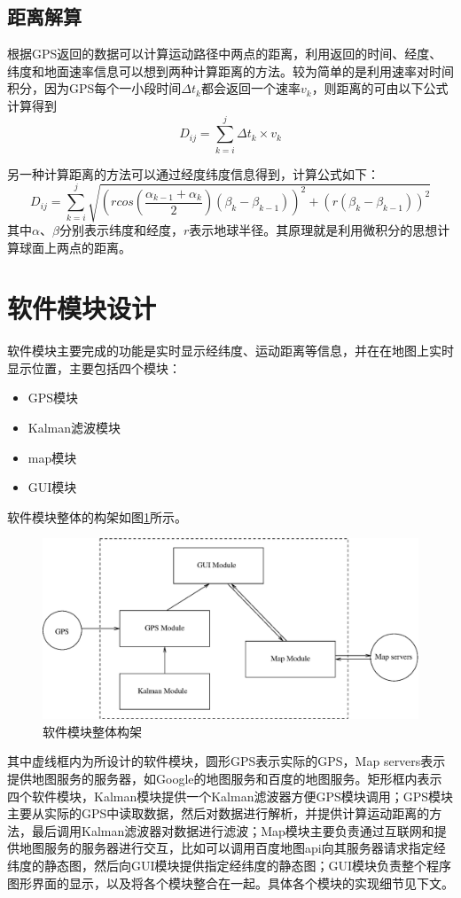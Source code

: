 \documentclass[a4paper, 12pt]{article}
\begin{document}
\subsection{距离解算}
根据GPS返回的数据可以计算运动路径中两点的距离，利用返回的时间、经度、纬度和地面速率信息可以想到两种计算距离的方法。较为简单的是利用速率对时间积分，因为GPS每个一小段时间$\Delta t_k$都会返回一个速率$v_k$，则距离的可由以下公式计算得到
\begin{equation}
  \label{eq:5}
  D_{ij} = \sum_{k=i}^j{\Delta t_k \times v_k}
\end{equation}

另一种计算距离的方法可以通过经度纬度信息得到，计算公式如下：
\begin{equation}
  \label{eq:6}
  D_{ij} = \sum_{k=i}^j{\sqrt{(rcos(\frac{\alpha_{k-1}+\alpha_k}{2})(\beta_k-\beta_{k-1}))^2+(r(\beta_k-\beta_{k-1}))^2}}
\end{equation}
其中$\alpha$、$\beta$分别表示纬度和经度，$r$表示地球半径。其原理就是利用微积分的思想计算球面上两点的距离。

\section{软件模块设计}
软件模块主要完成的功能是实时显示经纬度、运动距离等信息，并在在地图上实时显示位置，主要包括四个模块：
\begin{itemize}
\item GPS模块
\item Kalman滤波模块
\item map模块
\item GUI模块
\end{itemize}
软件模块整体的构架如图\ref{fig:2}所示。
\begin{figure}[ht]
  \centering
  \includegraphics[width=15cm]{f2.eps}
  \caption{软件模块整体构架}
  \label{fig:2}
\end{figure}
其中虚线框内为所设计的软件模块，圆形GPS表示实际的GPS，Map servers表示提供地图服务的服务器，如Google的地图服务和百度的地图服务。矩形框内表示四个软件模块，Kalman模块提供一个Kalman滤波器方便GPS模块调用；GPS模块主要从实际的GPS中读取数据，然后对数据进行解析，并提供计算运动距离的方法，最后调用Kalman滤波器对数据进行滤波；Map模块主要负责通过互联网和提供地图服务的服务器进行交互，比如可以调用百度地图api向其服务器请求指定经纬度的静态图，然后向GUI模块提供指定经纬度的静态图；GUI模块负责整个程序图形界面的显示，以及将各个模块整合在一起。具体各个模块的实现细节见下文。
\end{document}
